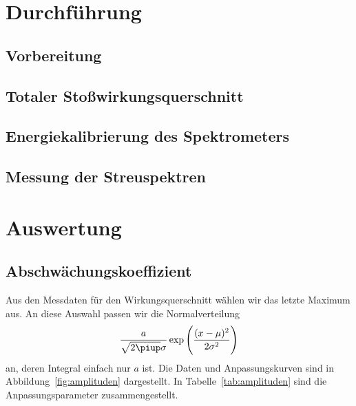 \documentclass[11pt, ngerman, fleqn, DIV=15, headinclude, BCOR=2cm]{scrreprt}
\begin{document}

\chapter{Durchführung}

\section{Vorbereitung}


\section{Totaler Stoßwirkungsquerschnitt}

\section{Energiekalibrierung des Spektrometers}

\section{Messung der Streuspektren}

\chapter{Auswertung}

\section{Abschwächungskoeffizient}

Aus den Messdaten für den Wirkungsquerschnitt wählen wir das letzte Maximum
aus. An diese Auswahl passen wir die Normalverteilung
\begin{equation}
    \frac{a}{\sqrt{2\piup} \sigma} \exp\del{\frac{(x-\mu)^2}{2\sigma^2}}
    \label{eq:gausskurve}
\end{equation}
an, deren Integral einfach nur $a$ ist. Die Daten und Anpassungskurven sind in
Abbildung~\ref{fig:amplituden} dargestellt. In Tabelle~\ref{tab:amplituden}
sind die Anpassungsparameter zusammengestellt.
\end{document}
